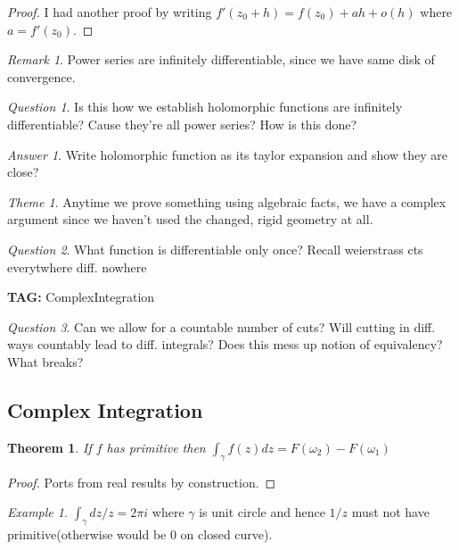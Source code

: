 \documentclass[11pt]{article}
\newtheorem{theorem}{Theorem}
\theoremstyle{remark}
\newtheorem{remark}{Remark}
\newtheorem{quest}{Question}
\newtheorem{ans}{Answer}
\newtheorem{theme}{Theme}
\newtheorem{example}{Example}
\begin{document}
\begin{proof}
	I had another proof by writing $f'(z_0 + h) = f(z_0) + ah + o(h)$ where $a = f'(z_0)$.
\end{proof}

\begin{remark}
	Power series are infinitely differentiable, since we have same disk of convergence. 
\end{remark}

\begin{quest}
	Is this how we establish holomorphic functions are infinitely differentiable? Cause they're all power series? How is this done?
\end{quest}

\begin{ans}
	Write holomorphic function as its taylor expansion and show they are close?
\end{ans}

\begin{theme}
	Anytime we prove something using algebraic facts, we have a complex argument since we haven't used the changed, rigid geometry at all.
\end{theme}

\begin{quest}
	What function is differentiable only once? Recall weierstrass cts everytwhere diff. nowhere
\end{quest}

\textbf{TAG:} ComplexIntegration

\begin{quest}
	Can we allow for a countable number of cuts? Will cutting in diff. ways countably lead to diff. integrals? Does this mess up notion of equivalency? What breaks? 
\end{quest}

\subsection{Complex Integration}

\begin{theorem}
	If $f$ has primitive then $\int_{\gamma} f(z)dz = F(\omega_2) - F(\omega_1)$
\end{theorem}

\begin{proof}
	Ports from real results by construction.
\end{proof}

\begin{example}
	$\int_{\gamma} dz/z=2\pi i$ where $\gamma$ is unit circle and hence $1/z$ must not have primitive(otherwise would be 0 on closed curve).
\end{example}
\end{document}
